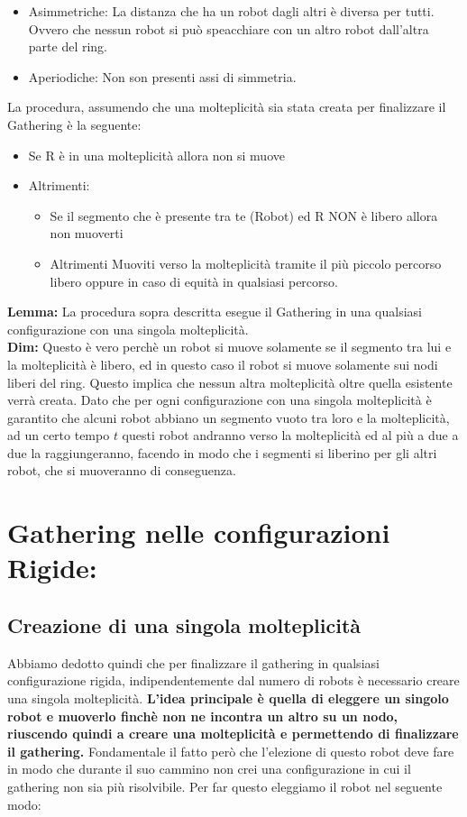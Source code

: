 \begin{itemize}
    \item Asimmetriche: La distanza che ha un robot dagli altri è diversa per tutti. Ovvero che nessun robot si può speacchiare con un altro robot dall'altra parte del ring.
    \item Aperiodiche: Non son presenti assi di simmetria.
\end{itemize}


La procedura, assumendo che una molteplicità sia stata creata per finalizzare il Gathering è la seguente:
\begin{itemize}
    \item Se R è in una molteplicità allora non si muove
    \item Altrimenti:
    \begin{itemize}
        \item Se il segmento che è presente tra te (Robot) ed R NON è libero allora non muoverti
        \item Altrimenti Muoviti verso la molteplicità tramite il più piccolo percorso libero oppure in caso di equità in qualsiasi percorso.
    \end{itemize}
\end{itemize}
\textbf{Lemma:} La procedura sopra descritta esegue il Gathering in una qualsiasi configurazione con una singola molteplicità.\\
\textbf{Dim:} Questo è vero perchè un robot si muove solamente se il segmento tra lui e la molteplicità è libero, ed in questo caso il robot si muove solamente sui nodi liberi del ring. Questo implica che nessun altra molteplicità oltre quella esistente verrà creata. Dato che per ogni configurazione con una singola molteplicità è garantito che alcuni robot abbiano un segmento vuoto tra loro e la molteplicità, ad un certo tempo $t$ questi robot andranno verso la molteplicità ed al più a due a due la raggiungeranno, facendo in modo che i segmenti si liberino per gli altri robot, che si muoveranno di conseguenza.

\section{Gathering nelle configurazioni Rigide:}
\subsection{Creazione di una singola molteplicità}
Abbiamo dedotto quindi che per finalizzare il gathering in qualsiasi configurazione rigida, indipendentemente dal numero di robots è necessario creare una singola molteplicità. \textbf{L'idea principale è quella di eleggere un singolo robot e muoverlo finchè non ne incontra un altro su un nodo, riuscendo quindi a creare una molteplicità e permettendo di finalizzare il gathering.} Fondamentale il fatto però che l'elezione di questo robot deve fare in modo che durante il suo cammino non crei una configurazione in cui il gathering non sia più risolvibile. Per far questo eleggiamo il robot nel seguente modo:\\

